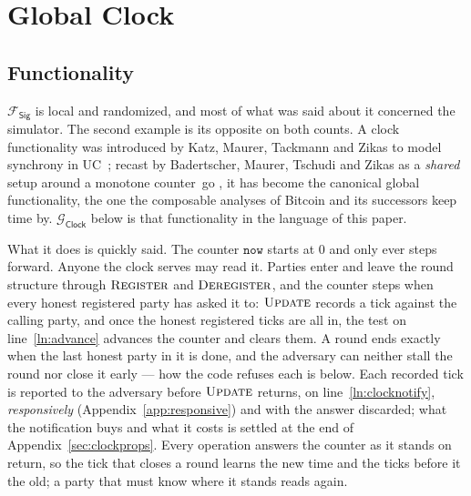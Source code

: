 \documentclass[11pt,a4paper]{article}
\newcommand{\op}[1]{\textsc{#1}}
\newcommand{\Fsig}{\mathcal{F}_{\mathsf{Sig}}}
\newcommand{\Gclock}{\mathcal{G}_{\mathsf{Clock}}}
\newcommand{\V}[1]{\mathtt{#1}}
\theoremstyle{accentdef}
\theoremstyle{accentplain}
\begin{document}
\section{Global Clock}\label{sec:gclock}

\subsection{Functionality}\label{sec:gclockfunc}

$\Fsig$ is local and randomized, and most of what was said about it concerned the simulator. The
second example is its opposite on both counts. A clock functionality was introduced by Katz,
Maurer, Tackmann and Zikas to model synchrony in UC~\cite{KMTZ13}; recast by Badertscher, Maurer,
Tschudi and Zikas as a \emph{shared} setup around a monotone counter~go \cite{BMTZ17}, it has become
the canonical global functionality, the one the composable analyses of Bitcoin and its successors
keep time by. $\Gclock$ below is that functionality in the language of this paper.

What it does is quickly said. The counter $\V{now}$ starts at $0$ and only ever steps forward.
Anyone the clock serves may read it. Parties enter and leave the round structure through
$\op{Register}$ and $\op{Deregister}$, and the counter steps when every honest registered party
has asked it to: $\op{Update}$ records a tick against the calling party, and once the honest
registered ticks are all in, the test on line~\ref{ln:advance} advances the counter and clears
them. A round ends exactly when the last honest party in it is done, and the adversary can
neither stall the round nor close it early --- how the code refuses each is below. Each recorded
tick is reported to the adversary before $\op{Update}$ returns, on line~\ref{ln:clocknotify},
\emph{responsively} (Appendix~\ref{app:responsive}) and with the answer discarded; what the
notification buys and what it costs is settled at the end of Appendix~\ref{sec:clockprops}.
Every operation answers the counter as it stands on return, so the tick that closes a round
learns the new time and the ticks before it the old; a party that must know where it stands
reads again.
\end{document}
